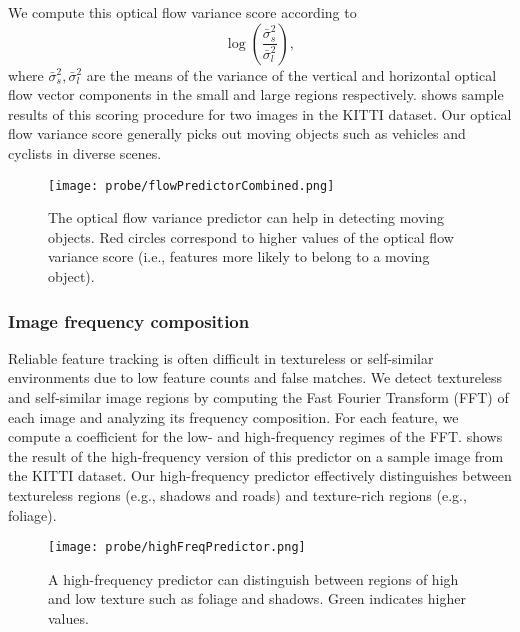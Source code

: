 We compute this optical flow variance score according to
\begin{equation}
    \log \left( \frac{\bar{\sigma}^2_s}{\bar{\sigma}^2_l} \right),
\end{equation}
where $\bar{\sigma}^2_s, \bar{\sigma}^2_l$ are the means of the variance of the vertical and horizontal optical flow vector components in the small and large regions respectively.
 shows sample results of this scoring procedure for two images in the KITTI dataset.
Our optical flow variance score generally picks out moving objects such as vehicles and cyclists in diverse scenes.

\begin{figure}
    \centering
    \texttt{[image: probe/flowPredictorCombined.png]}
    \caption{The optical flow variance predictor can help in detecting moving objects. Red circles correspond to higher values of the optical flow variance score (i.e., features more likely to belong to a moving object).}
    \label{fig:probe_flow_variance}
\end{figure}

\subsubsection{Image frequency composition}
Reliable feature tracking is often difficult in textureless or self-similar environments due to low feature counts and false matches.
We detect textureless and self-similar image regions by computing the Fast Fourier Transform (FFT) of each image and analyzing its frequency composition.
For each feature, we compute a coefficient for the low- and high-frequency regimes of the FFT.
 shows the result of the high-frequency version of this predictor on a sample image from the KITTI dataset.
Our high-frequency predictor effectively distinguishes between textureless regions (e.g., shadows and roads) and texture-rich regions (e.g., foliage).


\begin{figure}
    \centering
    \texttt{[image: probe/highFreqPredictor.png]}
    \caption{A high-frequency predictor can distinguish between regions of high and low texture such as foliage and shadows. Green indicates higher values.}
    \label{fig:probe_high_frequency}
\end{figure}



